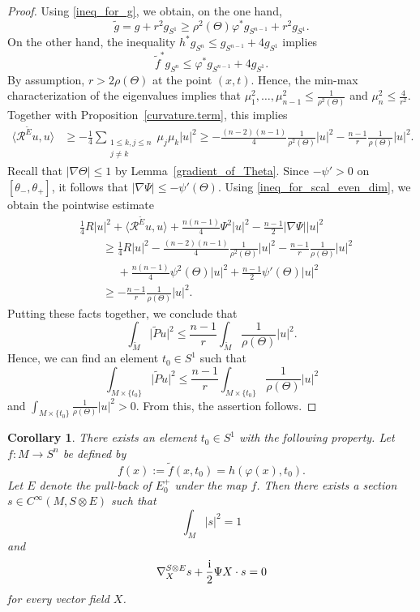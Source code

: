 \documentclass[11pt]{article}
\numberwithin{equation}{section}
\numberwithin{equation}{section}
\newtheorem{Corollary}[Theorem]{Corollary}
\begin{document}
\begin{proof}
Using \eqref{ineq_for_g}, we obtain, on the one hand,
\[
 \tilde{g} = g + r^2 g_{S^1} \geq \rho^2(\Theta) \varphi^* g_{S^{n-1}} + r^2 g_{S^1}.
 \]
On the other hand, the inequality $h^* g_{S^n} \leq g_{S^{n-1}} + 4 g_{S^1}$ implies
\[
 \tilde{f}^* g_{S^n} \leq \varphi^* g_{S^{n-1}} + 4 g_{S^1}.
\]
By assumption, $r > 2\rho(\Theta)$ at the point $(x,t)$. Hence, the min-max characterization of the eigenvalues implies that $\mu_1^2,\hdots,\mu_{n-1}^2 \leq \frac{1}{\rho^2(\Theta)}$ and $\mu_n^2 \leq \frac{4}{r^2}$.
Together with Proposition~\ref{curvature.term}, this implies
\begin{align*}
\big\langle \mathcal{R}^{\tilde{E}} u,u \big\rangle
&\geq -\frac{1}{4} \sum_{\substack{1\leq k,j\leq n\\ j \neq k}} \mu_j \mu_k |u|^2
\geq -\frac{(n-2)(n-1)}{4} \frac{1}{\rho^2(\Theta)} |u|^2 - \frac{n-1}{r} \frac{1}{\rho(\Theta)} |u|^2.
\end{align*}
Recall that $|\nabla \Theta| \leq 1$ by Lemma~\ref{gradient_of_Theta}.
Since $-\psi' > 0$ on $[\theta_-,\theta_+]$, it follows that $|\nabla \Psi| \leq -\psi'(\Theta)$.
Using \eqref{ineq_for_scal_even_dim}, we obtain the pointwise estimate
\begin{align*}
&\frac{1}{4} R |u|^2 + \big\langle \mathcal{R}^{\tilde{E}} u,u \big\rangle + \frac{n(n-1)}{4} \Psi^2 |u|^2 - \frac{n-1}{2} |\nabla \Psi| |u|^2 \\
&\qquad\geq \frac{1}{4} R |u|^2 - \frac{(n-2)(n-1)}{4} \frac{1}{\rho^2(\Theta)} |u|^2 - \frac{n-1}{r} \frac{1}{\rho(\Theta)} |u|^2\\
&\phantom{\qquad\geq }{}+ \frac{n(n-1)}{4} \psi^2(\Theta) |u|^2 + \frac{n-1}{2} \psi'(\Theta) |u|^2 \\
&\qquad\geq -\frac{n-1}{r} \frac{1}{\rho(\Theta)} |u|^2.
\end{align*}
Putting these facts together, we conclude that
\[
\int_{\tilde{M}} \big|\tilde{P} u\big|^2 \leq \frac{n-1}{r} \int_{\tilde{M}} \frac{1}{\rho(\Theta)} |u|^2.
\]
Hence, we can find an element $t_0 \in S^1$ such that
\[
\int_{M \times \{t_0\}} \big|\tilde{P} u\big|^2 \leq \frac{n-1}{r} \int_{M \times \{t_0\}} \frac{1}{\rho(\Theta)} |u|^2
\]
and $\int_{M \times \{t_0\}} \frac{1}{\rho(\Theta)} |u|^2 > 0$.
From this, the assertion follows.
\end{proof}


\begin{Corollary}
\label{limiting_spinor_even_dim}
There exists an element $t_0 \in S^1$ with the following property.
Let $f\colon M \to S^n$ be defined by
\[
 f(x) := \tilde{f}(x,t_0) = h(\varphi(x) ,t_0).
\]
Let $E$ denote the pull-back of $E_0^+$ under the map $f$.
Then there exists a section $s \in C^\infty(M,S \otimes E)$ such that
\[
 \int_M |s|^2 = 1
\]
and
\[
 \nabla_X^{S \otimes E} s + \frac{\rm i}{2} \Psi X \cdot s = 0
\]
for every vector field $X$.
\end{Corollary}
\end{document}
